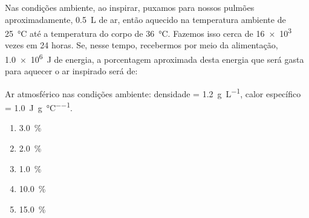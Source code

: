 Nas condições ambiente, ao inspirar, puxamos para nossos pulmões aproximadamente, \SI{0,5}{\liter} de ar, então aquecido na temperatura ambiente de \SI{25}{\celsius} até a temperatura do corpo de \SI{36}{\celsius}.
Fazemos isso cerca de \num{16e3} vezes em \num{24} horas.
Se, nesse tempo, recebermos por meio da alimentação, \SI{1,0e6}{\joule} de energia, a porcentagem aproximada desta energia que será gasta para aquecer o ar inspirado será de:

Ar atmosférico nas condições ambiente:
densidade = \SI{1,2}{\gram\per\liter}, calor específico = \SI{1,0}{\joule\per\gram\per\celsius}.

\begin{enumerate}[label = (\scalealph{\alph*})]
	\item \SI{3,0}{\percent}
	\item \SI{2,0}{\percent}
	\item \SI{1,0}{\percent}
	\item \SI{10,0}{\percent}
	\item \SI{15,0}{\percent}
\end{enumerate}
